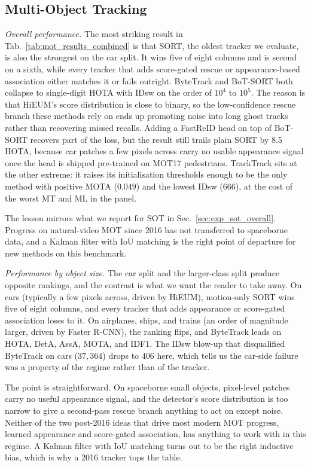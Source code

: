 \documentclass{article}
\newcommand{\subhead}[1]{\noindent\textbf{#1.}}
\newcommand{\minihead}[1]{\noindent\textit{#1.}}
\begin{document}

\subsection{Multi-Object Tracking}

\minihead{Overall performance}
\label{sec:exp_mot_overall}
The most striking result in Tab.~\ref{tab:mot_results_combined} is that
SORT, the oldest tracker we evaluate, is also the strongest on the car
split. It wins five of eight columns and is second on a sixth, while
every tracker that adds score-gated rescue or appearance-based
association either matches it or fails outright. ByteTrack and BoT-SORT
both collapse to single-digit HOTA with IDsw on the order of $10^4$
to $10^5$. The reason is that HiEUM's score distribution is close to
binary, so the low-confidence rescue branch these methods rely on ends
up promoting noise into long ghost tracks rather than recovering missed
recalls. Adding a FastReID head on top of BoT-SORT recovers part of
the loss, but the result still trails plain SORT by 8.5 HOTA, because
car patches a few pixels across carry no usable appearance signal once
the head is shipped pre-trained on MOT17 pedestrians. TrackTrack sits
at the other extreme: it raises its initialisation thresholds enough
to be the only method with positive MOTA ($0.049$) and the lowest
IDsw ($666$), at the cost of the worst MT and ML in the panel.

The lesson mirrors what we report for SOT in Sec.~\ref{sec:exp_sot_overall}.
Progress on natural-video MOT since 2016 has not transferred to
spaceborne data, and a Kalman filter with IoU matching is the right
point of departure for new methods on this benchmark.

\minihead{Performance by object size}
\label{sec:exp_mot_size}
The car split and the larger-class split produce opposite rankings,
and the contrast is what we want the reader to take away. On cars
(typically a few pixels across, driven by HiEUM), motion-only SORT
wins five of eight columns, and every tracker that adds appearance or
score-gated association loses to it. On airplanes, ships, and trains
(an order of magnitude larger, driven by Faster R-CNN), the ranking
flips, and ByteTrack leads on HOTA, DetA, AssA, MOTA, and IDF1. The
IDsw blow-up that disqualified ByteTrack on cars ($37{,}364$) drops to
$406$ here, which tells us the car-side failure was a property of the
regime rather than of the tracker.

The point is straightforward. On spaceborne small objects, pixel-level
patches carry no useful appearance signal, and the detector's score
distribution is too narrow to give a second-pass rescue branch anything
to act on except noise. Neither of the two post-2016 ideas that drive
most modern MOT progress, learned appearance and score-gated
association, has anything to work with in this regime. A Kalman filter
with IoU matching turns out to be the right inductive bias, which is
why a 2016 tracker tops the table.
\end{document}
